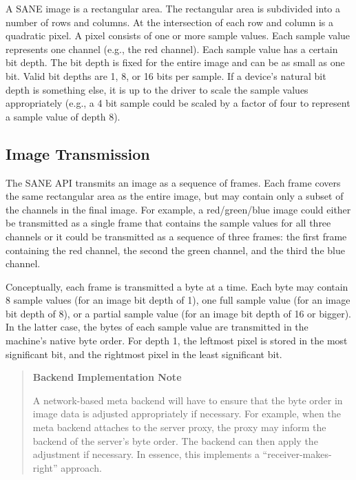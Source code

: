 \documentclass[11pt,DVIps]{report}
\begin{document}
A SANE image is a rectangular area.  The rectangular area is
subdivided into a number of rows and columns.  At the intersection of
each row and column is a quadratic pixel.  A pixel consists of one or
more sample values.  Each sample value represents one channel (e.g.,
the red channel).  Each sample value has a certain bit depth.  The bit
depth is fixed for the entire image and can be as small as one bit.
Valid bit depths are 1, 8, or 16 bits per sample.  If a device's
natural bit depth is something else, it is up to the driver to scale
the sample values appropriately (e.g., a 4 bit sample could be scaled
by a factor of four to represent a sample value of depth 8).

\subsection{Image Transmission}

The SANE API transmits an image as a sequence of frames.  Each frame
covers the same rectangular area as the entire image, but may contain
only a subset of the channels in the final image.  For example, a
red/green/blue image could either be transmitted as a single frame
that contains the sample values for all three channels or it could be
transmitted as a sequence of three frames: the first frame containing
the red channel, the second the green channel, and the third the blue
channel.

Conceptually, each frame is transmitted a byte at a time.  Each byte
may contain 8 sample values (for an image bit depth of 1), one full
sample value (for an image bit depth of 8), or a partial sample value
(for an image bit depth of 16 or bigger).  In the latter case, the
bytes of each sample value are transmitted in the machine's native
byte order. For depth 1, the leftmost pixel is stored in the most
significant bit, and the rightmost pixel in the least significant bit.
\begin{quote}
  \begin{center}
    {\bf Backend Implementation Note}
  \end{center}
  A network-based meta backend will have to ensure that the byte order
  in image data is adjusted appropriately if necessary.  For example,
  when the meta backend attaches to the server proxy, the proxy may
  inform the backend of the server's byte order.  The backend can then
  apply the adjustment if necessary.  In essence, this implements a
  ``receiver-makes-right'' approach.
\end{quote}
\end{document}
